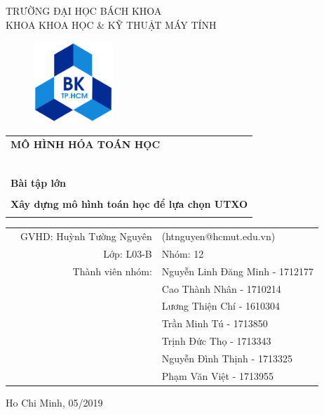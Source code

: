 \documentclass[a4paper]{article}
\begin{document}
\begin{titlepage}

\begin{center}
TRƯỜNG ĐẠI HỌC BÁCH KHOA\\
KHOA KHOA HỌC \& KỸ THUẬT MÁY TÍNH
\end{center}

\vspace{1cm}

\begin{figure}[h!]
\begin{center}
\includegraphics[width=3cm]{hcmut.png}
\end{center}
\end{figure}

\vspace{1cm}


\begin{center}
\begin{tabular}{c}
\multicolumn{1}{l}{\textbf{{\Large MÔ HÌNH HÓA TOÁN HỌC}}}\\
~~\\
\hline
\\
\multicolumn{1}{l}{\textbf{{\Large Bài tập lớn}}}\\
\\
\textbf{\huge Xây dựng mô hình toán học để lựa chọn UTXO}\\
\\
\hline
\end{tabular}
\end{center}

\vspace{3cm}

\begin{table}[h]
\begin{tabular}{rrl}

\hspace{5 cm} & GVHD: Huỳnh Tường Nguyên & (htnguyen@hcmut.edu.vn)\\
& Lớp: L03-B & Nhóm: 12\\
& Thành viên nhóm: & Nguyễn Linh Đăng Minh - 1712177 \\
& & Cao Thành Nhân - 1710214 \\
& & Lương Thiện Chí - 1610304 \\
& & Trần Minh Tú - 1713850 \\
& & Trịnh Đức Thọ - 1713343 \\
& & Nguyễn Đình Thịnh - 1713325 \\
& & Phạm Văn Việt - 1713955 \\
\end{tabular}
\end{table}

\begin{center}
{\footnotesize Ho Chi Minh, 05/2019}
\end{center}
\end{titlepage}
\end{document}
